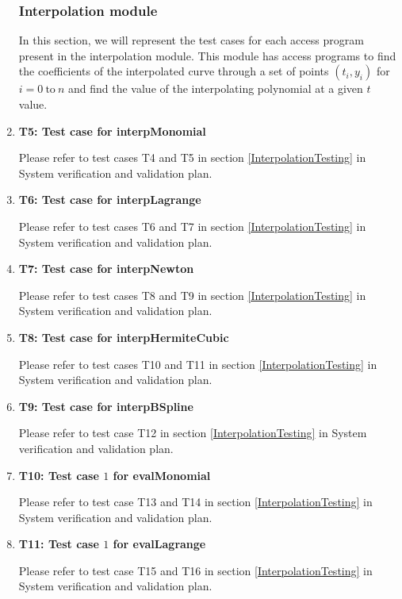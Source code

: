 \documentclass[12pt, titlepage]{article}
\begin{document}
\begin{enumerate}
    
\subsubsection{Interpolation module}

In this section, we will represent the test cases for each access program 
present in the interpolation module. This module has access programs to find 
the coefficients of the interpolated curve through a set of points $(t_i,y_i)$ 
for $i = 0\ \text{to}\ n$ and find the value of the interpolating polynomial at 
a given $t$ value.

\item{\textbf{T5: Test case for interpMonomial}}

Please refer to test cases T4 and T5 in section \ref{InterpolationTesting} in 
System verification 
and 
validation plan.


\item{\textbf{T6: Test case for interpLagrange}}

Please refer to test cases T6 and T7 in section \ref{InterpolationTesting} in 
System verification 
and 
validation plan.


\item{\textbf{T7: Test case for interpNewton}}

Please refer to test cases T8 and T9 in section \ref{InterpolationTesting} in 
System verification 
and 
validation plan.

\item{\textbf{T8: Test case for interpHermiteCubic}}

Please refer to test cases T10 and T11 in section \ref{InterpolationTesting} in 
System verification and validation plan.


\item{\textbf{T9: Test case for interpBSpline}}

Please refer to test case T12 in section \ref{InterpolationTesting} in System 
verification and validation plan.


\item{\textbf{T10: Test case $1$ for evalMonomial}}

Please refer to test case T13 and T14 in section \ref{InterpolationTesting} in 
System verification and validation plan.



\item{\textbf{T11: Test case $1$ for evalLagrange}}


Please refer to test case T15 and T16 in section \ref{InterpolationTesting} in 
System 
verification and validation plan.



\end{enumerate}
\end{document}
